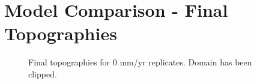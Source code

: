 \appendix

\chapter{Model Comparison - Final Topographies}

\begin{figure}[!ht]
	\caption{Final topographies for 0 mm/yr replicates. Domain has been clipped.}
	\label{fig:000topo}
\end{figure}

